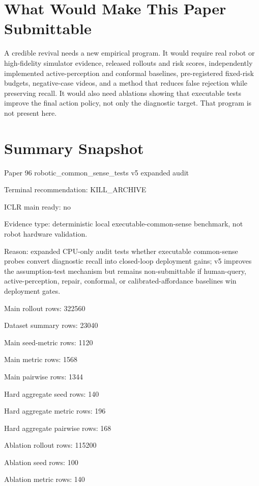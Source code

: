 \documentclass{article}
\begin{document}
\section{What Would Make This Paper Submittable}
A credible revival needs a new empirical program. It would require real robot or high-fidelity simulator evidence, released rollouts and risk scores, independently implemented active-perception and conformal baselines, pre-registered fixed-risk budgets, negative-case videos, and a method that reduces false rejection while preserving recall. It would also need ablations showing that executable tests improve the final action policy, not only the diagnostic target. That program is not present here.

\section{Summary Snapshot}
\begingroup\footnotesize
\noindent Paper 96 robotic\_common\_sense\_tests v5 expanded audit\par
\noindent Terminal recommendation: KILL\_ARCHIVE\par
\noindent ICLR main ready: no\par
\noindent Evidence type: deterministic local executable-common-sense benchmark, not robot hardware validation.\par
\noindent Reason: expanded CPU-only audit tests whether executable common-sense probes convert diagnostic recall into closed-loop deployment gains; v5 improves the assumption-test mechanism but remains non-submittable if human-query, active-perception, repair, conformal, or calibrated-affordance baselines win deployment gates.\par
\noindent Main rollout rows: 322560\par
\noindent Dataset summary rows: 23040\par
\noindent Main seed-metric rows: 1120\par
\noindent Main metric rows: 1568\par
\noindent Main pairwise rows: 1344\par
\noindent Hard aggregate seed rows: 140\par
\noindent Hard aggregate metric rows: 196\par
\noindent Hard aggregate pairwise rows: 168\par
\noindent Ablation rollout rows: 115200\par
\noindent Ablation seed rows: 100\par
\noindent Ablation metric rows: 140\par
\end{document}

